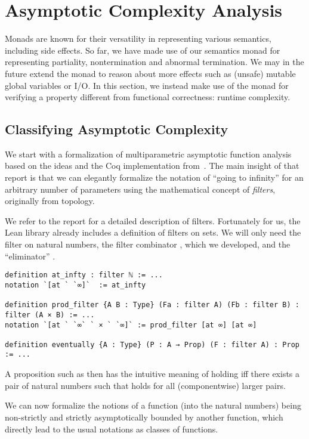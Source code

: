 \section{Asymptotic Complexity Analysis}
\label{sec:asymptotic}

Monads are known for their versatility in representing various semantics,
including side effects. So far, we have made use of our semantics monad for
representing partiality, \ie nontermination and abnormal termination. We may in
the future extend the monad to reason about more effects such as (unsafe) mutable global
variables or I/O. In this section, we instead make use of the monad for verifying a
property different from functional correctness: runtime complexity.

\subsection{Classifying Asymptotic Complexity}

We start with a formalization of multiparametric asymptotic function analysis
based on the ideas and the Coq implementation from~\cite{gueneau}. The main insight of that report is that
we can elegantly formalize the notation of ``going to infinity'' for an
arbitrary number of parameters using the mathematical concept of \emph{filters},
originally from topology.

We refer to the report for a detailed description of
filters. Fortunately for us, the Lean library already includes
a definition of filters on sets. We will only need the filter  on
natural numbers, the filter combinator , which we developed,
and the ``eliminator'' .

\begin{verbatim}
definition at_infty : filter ℕ := ...
notation `[at ` `∞]`  := at_infty

definition prod_filter {A B : Type} (Fa : filter A) (Fb : filter B) : filter (A × B) := ...
notation `[at ` `∞` ` × ` `∞]` := prod_filter [at ∞] [at ∞]

definition eventually {A : Type} (P : A → Prop) (F : filter A) : Prop := ...
\end{verbatim}

A proposition such as  then has the intuitive meaning
of holding iff there exists a pair of natural numbers such that  holds
for all (componentwise) larger pairs.

We can now formalize the notions of a function (into the natural numbers) being non-strictly and strictly
asymptotically bounded by another function, which directly lead to the usual
notations as classes of functions.

